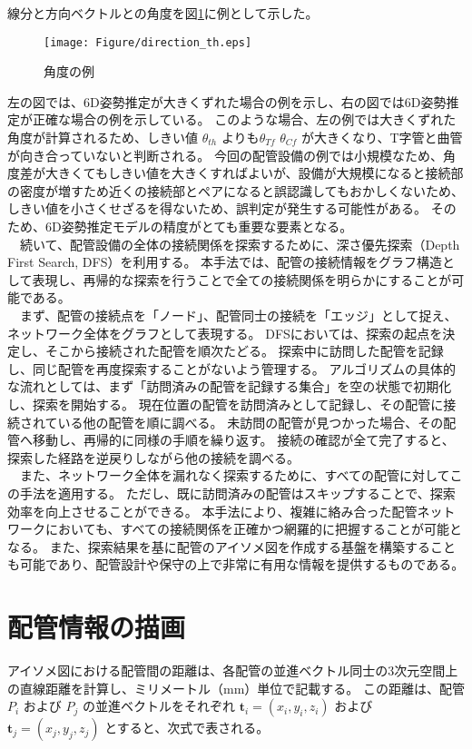 線分と方向ベクトルとの角度を図\ref{fig:f3}に例として示した。
\begin{figure}[htbt]
  \centering
   \texttt{[image: Figure/direction\_th.eps]}
   \caption{角度の例}
   \label{fig:f3}
\end{figure}
左の図では、6D姿勢推定が大きくずれた場合の例を示し、右の図では6D姿勢推定が正確な場合の例を示している。
このような場合、左の例では大きくずれた角度が計算されるため、しきい値 $\theta_{th}$ よりも$\theta_{Tf}$ $\theta_{Cf}$ が大きくなり、T字管と曲管が向き合っていないと判断される。
今回の配管設備の例では小規模なため、角度差が大きくてもしきい値を大きくすればよいが、設備が大規模になると接続部の密度が増すため近くの接続部とペアになると誤認識してもおかしくないため、しきい値を小さくせざるを得ないため、誤判定が発生する可能性がある。
そのため、6D姿勢推定モデルの精度がとても重要な要素となる。\\
　続いて、配管設備の全体の接続関係を探索するために、深さ優先探索（Depth First Search, DFS）を利用する。
本手法では、配管の接続情報をグラフ構造として表現し、再帰的な探索を行うことで全ての接続関係を明らかにすることが可能である。\\
　まず、配管の接続点を「ノード」、配管同士の接続を「エッジ」として捉え、ネットワーク全体をグラフとして表現する。
DFSにおいては、探索の起点を決定し、そこから接続された配管を順次たどる。
探索中に訪問した配管を記録し、同じ配管を再度探索することがないよう管理する。
アルゴリズムの具体的な流れとしては、まず「訪問済みの配管を記録する集合」を空の状態で初期化し、探索を開始する。
現在位置の配管を訪問済みとして記録し、その配管に接続されている他の配管を順に調べる。
未訪問の配管が見つかった場合、その配管へ移動し、再帰的に同様の手順を繰り返す。
接続の確認が全て完了すると、探索した経路を逆戻りしながら他の接続を調べる。\\
　また、ネットワーク全体を漏れなく探索するために、すべての配管に対してこの手法を適用する。
ただし、既に訪問済みの配管はスキップすることで、探索効率を向上させることができる。
本手法により、複雑に絡み合った配管ネットワークにおいても、すべての接続関係を正確かつ網羅的に把握することが可能となる。
また、探索結果を基に配管のアイソメ図を作成する基盤を構築することも可能であり、配管設計や保守の上で非常に有用な情報を提供するものである。

\section{配管情報の描画}
アイソメ図における配管間の距離は、各配管の並進ベクトル同士の3次元空間上の直線距離を計算し、ミリメートル（mm）単位で記載する。
この距離は、配管 $P_i$ および $P_j$ の並進ベクトルをそれぞれ $\mathbf{t}_i = (x_i, y_i, z_i)$ および $\mathbf{t}_j = (x_j, y_j, z_j)$ とすると、次式で表される。

